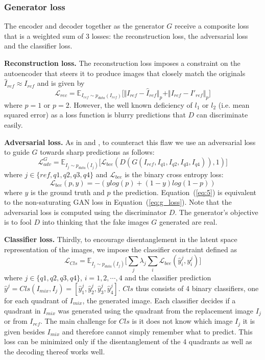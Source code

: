 \documentclass[12pt,a4paper]{article}
\begin{document}
\subsubsection{Generator loss}
The encoder and decoder together as the generator $G$ receive a composite loss that is a weighted sum of 3 losses: the reconstruction loss, the adversarial loss and the classifier loss. 

\textbf{Reconstruction loss.} The reconstruction loss imposes a constraint on the autoencoder that steers it to produce images that closely match the originals $\hat{I}_{ref} \approx I_{ref}$ and is given by
\begin{equation} \label{eq:4}
    \mathcal{L}_{rec} = \mathbb{E}_{I_{ref}\sim p_{data} (I_{ref})}\big[ \Vert I_{ref} - \hat{I}_{ref} \Vert_p + \Vert I_{ref} - I'_{ref} \Vert_p \big]
\end{equation}
where $p = 1$ or $p = 2$. However, the well known deficiency of $l_1$ or $l_2$ (i.e. mean squared error) as a loss function is blurry predictions that $D$ can discriminate easily. 

\textbf{Adversarial loss.} As in \cite{DisentFacOfVarByMixTh} and \cite{1511.05440}, to counteract this flaw we use an adversarial loss to guide $G$ towards sharp predictions as follows:
\begin{equation} \label{eq:5}
    \mathcal{L}^G_{adv} = \mathbb{E}_{I_{j}\sim p_{data} (I_{j})}\big[ \mathcal{L}_{bce}(D(G(I_{ref},I_{q1},I_{q2},I_{q3},I_{q4})), 1)\big]
\end{equation}
where $j \in \{ref,q1,q2,q3,q4\}$ and $\mathcal{L}_{bce}$ is the binary cross entropy loss:
\begin{equation} \label{eq:6}
    \mathcal{L}_{bce}(p, y) = -(ylog(p) + (1 - y)log(1-p))
\end{equation}
where $y$ is the ground truth and $p$ the prediction. Equation~(\ref{eq:5}) is equivalent to the non-saturating GAN loss in Equation~(\ref{eq:g_loss}). Note that the adversarial loss is computed using the discriminator $D$. The generator's objective is to fool $D$ into thinking that the fake images $G$ generated are real.

\textbf{Classifier loss.} Thirdly, to encourage disentanglement in the latent space representation of the images, we impose the classifier constraint defined as
\begin{equation} \label{eq:cls}
    \mathcal{L}_{Cls} = \mathbb{E}_{I_{j}\sim p_{data} (I_{j})}\big[\sum_{j} \lambda_j \sum_{i} \mathcal{L}_{bce}(\hat{y}^j_i, y^j_i)\big]
\end{equation}
where $j \in \{q1,q2,q3,q4\}$, $i=1,2,\cdots,4$ and the classifier prediction $\hat{y}^j = Cls(I_{mix}, I_j) = [\hat{y}^j_1, \hat{y}^j_2, \hat{y}^j_3, \hat{y}^j_4]$. $Cls$ thus consists of 4 binary classifiers, one for each quadrant of $I_{mix}$, the generated image. Each classifier decides if a quadrant in $I_{mix}$ was generated using the quadrant from the replacement image $I_j$ or from $I_{ref}$. The main challenge for $Cls$ is it does not know which image $I_j$ it is given besides $I_{mix}$ and therefore cannot simply remember what to predict. This loss can be minimized only if the disentanglement of the 4 quadrants as well as the decoding thereof works well.
\end{document}
